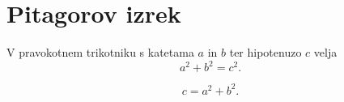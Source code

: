 \documentclass{article}
\begin{document}
\section*{Pitagorov izrek}
V pravokotnem trikotniku s katetama \(a\) in \(b\) ter hipotenuzo \(c\) velja
\[ a^2 + b^2 = c^2  . \]

\[ c= a^2 + b^2  . \]
\end{document}
